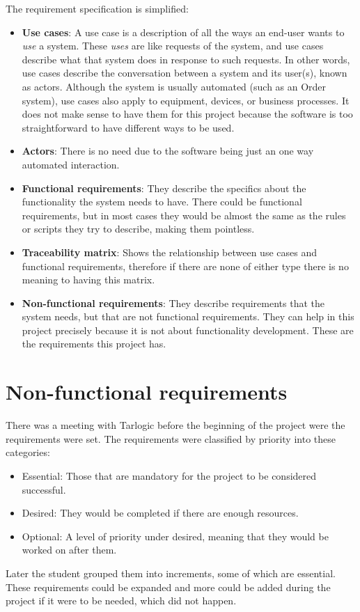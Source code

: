 \linej
\linej
The requirement specification is simplified:
\begin{itemize}
	\item \textbf{Use cases}: A use case is a description of all the ways an end-user wants to \textit{use} a system. These \textit{uses} are like requests of the system, and use cases describe what that system does in response to such requests. In other words, use cases describe the conversation between a system and its user(s), known as actors. Although the system is usually automated (such as an Order system), use cases also apply to equipment, devices, or business processes\cite{use_case_definition}. It does not make sense to have them for this project because the software is too straightforward to have different ways to be used.
	\item \textbf{Actors}: There is no need due to the software being just an one way automated interaction.
	\item \textbf{Functional requirements}: They describe the specifics about the functionality the system needs to have. There could be functional requirements, but in most cases they would be almost the same as the rules or scripts they try to describe, making them pointless.
	\item \textbf{Traceability matrix}: Shows the relationship between use cases and functional requirements, therefore if there are none of either type there is no meaning to having this matrix.
	\item \textbf{Non-functional requirements}: They describe requirements that the system needs, but that are not functional requirements. They can help in this project precisely because it is not about functionality development. These are the requirements this project has.
\end{itemize}

\section{Non-functional requirements}
There was a meeting with Tarlogic before the beginning of the project were the requirements were set.
The requirements were classified by priority into these categories:
\begin{itemize}
	\item Essential: Those that are mandatory for the project to be considered successful.
	\item Desired: They would be completed if there are enough resources.
	\item Optional: A level of priority under desired, meaning that they would be worked on after them.
\end{itemize}
\linej
Later the student grouped them into increments, some of which are essential.
\linej
\linej
These requirements could be expanded and more could be added during the project if it were to be needed, which did not happen.

